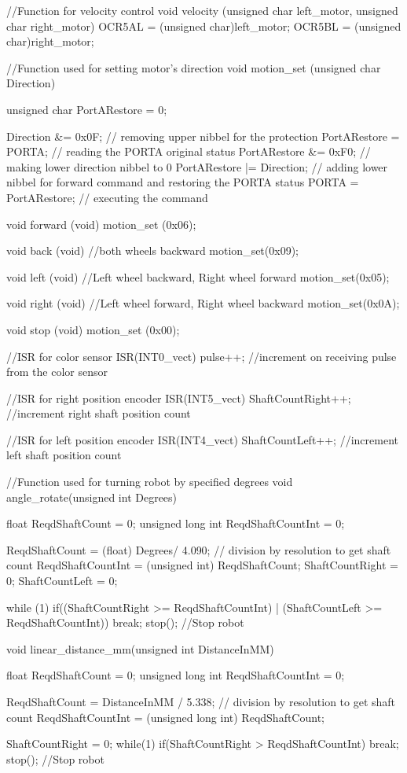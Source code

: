 //Function for velocity control
void velocity (unsigned char left_motor, unsigned char right_motor)
{
	OCR5AL = (unsigned char)left_motor;
	OCR5BL = (unsigned char)right_motor;
}

//Function used for setting motor's direction
void motion_set (unsigned char Direction)
{
 unsigned char PortARestore = 0;

 Direction &= 0x0F; 		// removing upper nibbel for the protection
 PortARestore = PORTA; 		// reading the PORTA original status
 PortARestore &= 0xF0; 		// making lower direction nibbel to 0
 PortARestore |= Direction; // adding lower nibbel for forward command and restoring the PORTA status
 PORTA = PortARestore; 		// executing the command
}

void forward (void) 
{
  motion_set (0x06);
}

void back (void) //both wheels backward
{
	motion_set(0x09);
}

void left (void) //Left wheel backward, Right wheel forward
{
	motion_set(0x05);
}

void right (void) //Left wheel forward, Right wheel backward
{
	motion_set(0x0A);
}

void stop (void)
{
  motion_set (0x00);
}

//ISR for color sensor
ISR(INT0_vect)
{
	pulse++; //increment on receiving pulse from the color sensor
}

//ISR for right position encoder
ISR(INT5_vect)
{
	ShaftCountRight++;  //increment right shaft position count
}


//ISR for left position encoder
ISR(INT4_vect)
{
	ShaftCountLeft++;  //increment left shaft position count
}

//Function used for turning robot by specified degrees
void angle_rotate(unsigned int Degrees)
{
	float ReqdShaftCount = 0;
	unsigned long int ReqdShaftCountInt = 0;

	ReqdShaftCount = (float) Degrees/ 4.090; // division by resolution to get shaft count
	ReqdShaftCountInt = (unsigned int) ReqdShaftCount;
	ShaftCountRight = 0;
	ShaftCountLeft = 0;

	while (1)
	{
		if((ShaftCountRight >= ReqdShaftCountInt) | (ShaftCountLeft >= ReqdShaftCountInt))
		break;
	}
	stop(); //Stop robot
}

void linear_distance_mm(unsigned int DistanceInMM)
{
	float ReqdShaftCount = 0;
	unsigned long int ReqdShaftCountInt = 0;

	ReqdShaftCount = DistanceInMM / 5.338; // division by resolution to get shaft count
	ReqdShaftCountInt = (unsigned long int) ReqdShaftCount;
	
	ShaftCountRight = 0;
	while(1)
	{
		if(ShaftCountRight > ReqdShaftCountInt)
		{
			break;
		}
	}
	stop(); //Stop robot
}

